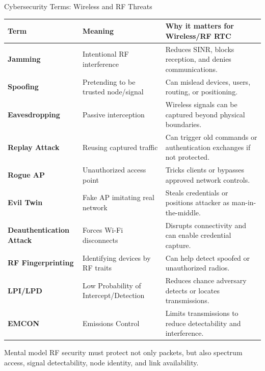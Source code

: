 \documentclass[aspectratio=169]{beamer}
\begin{document}
\begin{frame}{Cybersecurity Terms: Wireless and RF Threats}
\tiny
\begin{tabular}{p{2.2cm} p{3.5cm} p{6.5cm}}
\toprule
\textbf{Term} & \textbf{Meaning} & \textbf{Why it matters for Wireless/RF RTC} \\
\midrule
\textbf{Jamming} & Intentional RF interference & Reduces SINR, blocks reception, and denies communications. \\
\textbf{Spoofing} & Pretending to be trusted node/signal & Can mislead devices, users, routing, or positioning. \\
\textbf{Eavesdropping} & Passive interception & Wireless signals can be captured beyond physical boundaries. \\
\textbf{Replay Attack} & Reusing captured traffic & Can trigger old commands or authentication exchanges if not protected. \\
\textbf{Rogue AP} & Unauthorized access point & Tricks clients or bypasses approved network controls. \\
\textbf{Evil Twin} & Fake AP imitating real network & Steals credentials or positions attacker as man-in-the-middle. \\
\textbf{Deauthentication Attack} & Forces Wi-Fi disconnects & Disrupts connectivity and can enable credential capture. \\
\textbf{RF Fingerprinting} & Identifying devices by RF traits & Can help detect spoofed or unauthorized radios. \\
\textbf{LPI/LPD} & Low Probability of Intercept/Detection & Reduces chance adversary detects or locates transmissions. \\
\textbf{EMCON} & Emissions Control & Limits transmissions to reduce detectability and interference. \\
\bottomrule
\end{tabular}

\vspace{0.15cm}
\begin{block}{Mental model}
RF security must protect not only packets, but also spectrum access, signal detectability, node identity, and link availability.
\end{block}
\end{frame}
\end{document}
